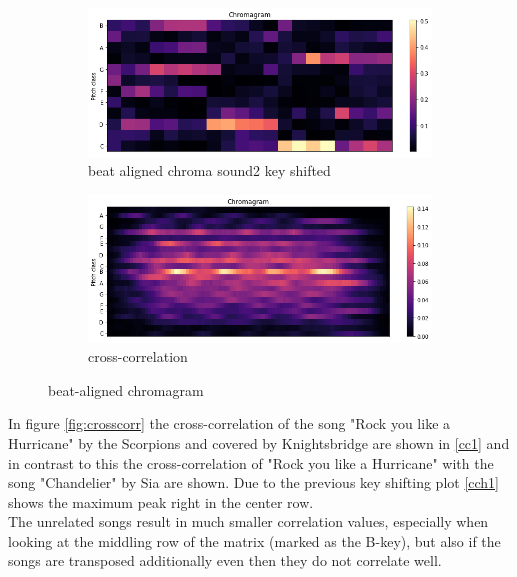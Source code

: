 \begin{figure}[htbp]
{{			\begin{subfigure}{.495\textwidth}
				\centering     
				\includegraphics[scale=0.3]{Images/Chroma/beatalignedchroma2_ks.png}
				\caption{beat aligned chroma sound2 key shifted}
				\label{cks2}
			\end{subfigure}%
			\begin{subfigure}{.495\textwidth}
				\centering     
				\includegraphics[scale=0.3]{Images/Chroma/beatalignedchroma_corr.png}
				\caption{cross-correlation}
				\label{c2}
			\end{subfigure}%
	}}
	\caption{beat-aligned chromagram}
	\label{fig:beatalign}
\end{figure}
In figure \ref{fig:crosscorr} the cross-correlation of the song "Rock you like a Hurricane" by the Scorpions and covered by Knightsbridge are shown in \ref{cc1} and in contrast to this the cross-correlation of "Rock you like a Hurricane" with the song "Chandelier" by Sia are shown. Due to the previous key shifting plot \ref{cch1} shows the maximum peak right in the center row.\\
The unrelated songs result in much smaller correlation values, especially when looking at the middling row of the matrix (marked as the B-key), but also if the songs are transposed additionally even then they do not correlate well. 

